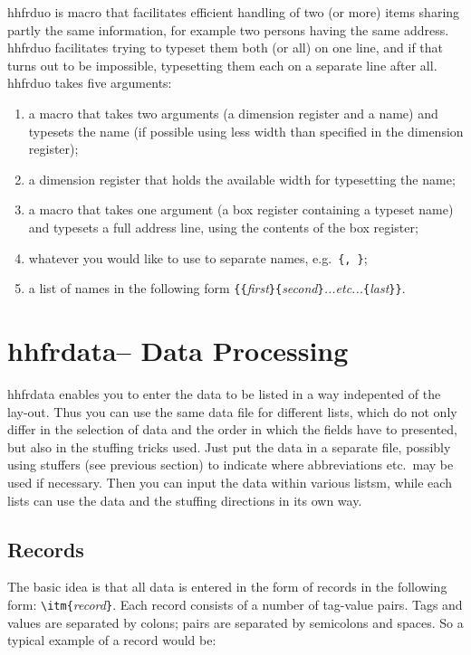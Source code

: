 \documentclass[11pt]{article}
\makeatletter
\def\packagename#1{{\sffamily #1}}     %
\def\macroname#1{{\ttfamily\@ttbs#1}}  %
\def\hhfrdata{\packagename{hhfrdata}\xspace}
\def\={\verb=}
\def\<#1>{\macroname{#1}}
\makeatother
\begin{document}
\<hhfrduo> is macro that facilitates efficient handling of
two (or more) items sharing partly the same information,
for example two persons having the same address. \<hhfrduo>
facilitates trying to typeset them both (or all) on one line,
and if that turns out to be impossible, typesetting them each
on a separate line after all. \<hhfrduo> takes five arguments:\begin{enumerate}
\item a macro that takes two arguments (a dimension register and a name)
  and typesets the name (if possible using less width than specified in
  the dimension register);
\item a dimension register that holds the available width for typesetting
  the name;
\item a macro that takes one argument (a box register containing a typeset
  name) and typesets a full address line, using the contents of the box
  register;
\item whatever you would like to use to separate names, e.g.\ \={, }=;
\item a list of names in the following form
  \={{=\textit{first}\=}{=\textit{second}\=}=\textit{...etc...}\={=\textit{last}\=}}=.
\end{enumerate}

\section{\hhfrdata -- Data Processing}

\hhfrdata enables you to enter the data to be listed in a way
indepented of the lay-out. Thus you can use the same data file
for different lists, which do not only differ in the selection of
data and the order in which the fields have to presented, but
also in the stuffing tricks used. Just put the data in a separate
file, possibly using stuffers (see previous section) to indicate
where abbreviations etc.\ may be used if necessary. Then you can
input the data within various listsm, while each lists can use
the data and the stuffing directions in its own way.

\subsection{Records}

The basic idea is that all data is entered in the form of records
in the following form: \=\itm{=\textit{record}\=}=. Each record
consists of a number of tag-value pairs. Tags and values are
separated by colons; pairs are separated by semicolons and spaces.
So a typical example of a record would be:
\end{document}
